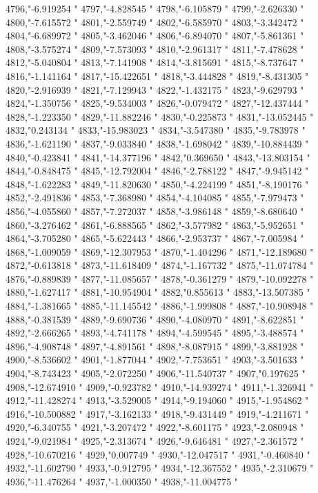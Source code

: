 4796,"-6.919254
"
4797,"-4.828545
"
4798,"-6.105879
"
4799,"-2.626330
"
4800,"-7.615572
"
4801,"-2.559749
"
4802,"-6.585970
"
4803,"-3.342472
"
4804,"-6.689972
"
4805,"-3.462046
"
4806,"-6.894070
"
4807,"-5.861361
"
4808,"-3.575274
"
4809,"-7.573093
"
4810,"-2.961317
"
4811,"-7.478628
"
4812,"-5.040804
"
4813,"-7.141908
"
4814,"-3.815691
"
4815,"-8.737647
"
4816,"-1.141164
"
4817,"-15.422651
"
4818,"-3.444828
"
4819,"-8.431305
"
4820,"-2.916939
"
4821,"-7.129943
"
4822,"-1.432175
"
4823,"-9.629793
"
4824,"-1.350756
"
4825,"-9.534003
"
4826,"-0.079472
"
4827,"-12.437444
"
4828,"-1.223350
"
4829,"-11.882246
"
4830,"-0.225873
"
4831,"-13.052445
"
4832,"0.243134
"
4833,"-15.983023
"
4834,"-3.547380
"
4835,"-9.783978
"
4836,"-1.621190
"
4837,"-9.033840
"
4838,"-1.698042
"
4839,"-10.884439
"
4840,"-0.423841
"
4841,"-14.377196
"
4842,"0.369650
"
4843,"-13.803154
"
4844,"-0.848475
"
4845,"-12.792004
"
4846,"-2.788122
"
4847,"-9.945142
"
4848,"-1.622283
"
4849,"-11.820630
"
4850,"-4.224199
"
4851,"-8.190176
"
4852,"-2.491836
"
4853,"-7.368980
"
4854,"-4.104085
"
4855,"-7.979473
"
4856,"-4.055860
"
4857,"-7.272037
"
4858,"-3.986148
"
4859,"-8.680640
"
4860,"-3.276462
"
4861,"-6.888565
"
4862,"-3.577982
"
4863,"-5.952651
"
4864,"-3.705280
"
4865,"-5.622443
"
4866,"-2.953737
"
4867,"-7.005984
"
4868,"-1.009059
"
4869,"-12.307953
"
4870,"-1.404296
"
4871,"-12.189680
"
4872,"-0.613818
"
4873,"-11.618409
"
4874,"-1.167732
"
4875,"-11.074784
"
4876,"-0.889839
"
4877,"-11.085657
"
4878,"-0.361279
"
4879,"-10.092278
"
4880,"-1.627417
"
4881,"-10.954904
"
4882,"0.855613
"
4883,"-13.507385
"
4884,"-1.381665
"
4885,"-11.145542
"
4886,"-1.999808
"
4887,"-10.908948
"
4888,"-0.381539
"
4889,"-9.690736
"
4890,"-4.080970
"
4891,"-8.622851
"
4892,"-2.666265
"
4893,"-4.741178
"
4894,"-4.599545
"
4895,"-3.488574
"
4896,"-4.908748
"
4897,"-4.891561
"
4898,"-8.087915
"
4899,"-3.881928
"
4900,"-8.536602
"
4901,"-1.877044
"
4902,"-7.753651
"
4903,"-3.501633
"
4904,"-8.743423
"
4905,"-2.072250
"
4906,"-11.540737
"
4907,"0.197625
"
4908,"-12.674910
"
4909,"-0.923782
"
4910,"-14.939274
"
4911,"-1.326941
"
4912,"-11.428274
"
4913,"-3.529005
"
4914,"-9.194060
"
4915,"-1.954862
"
4916,"-10.500882
"
4917,"-3.162133
"
4918,"-9.431449
"
4919,"-4.211671
"
4920,"-6.340755
"
4921,"-3.207472
"
4922,"-8.601175
"
4923,"-2.080948
"
4924,"-9.021984
"
4925,"-2.313674
"
4926,"-9.646481
"
4927,"-2.361572
"
4928,"-10.670216
"
4929,"0.007749
"
4930,"-12.047517
"
4931,"-0.460840
"
4932,"-11.602790
"
4933,"-0.912795
"
4934,"-12.367552
"
4935,"-2.310679
"
4936,"-11.476264
"
4937,"-1.000350
"
4938,"-11.004775
"
